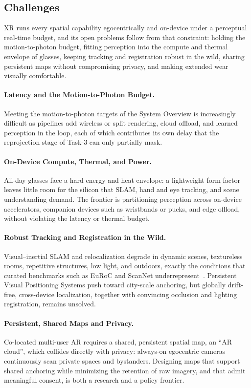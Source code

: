 \subsection{Challenges}
\label{subsec:p4-sec10-1-challenges}

XR runs every spatial capability egocentrically and on-device under a perceptual real-time budget, and its open problems follow from that constraint: holding the motion-to-photon budget, fitting perception into the compute and thermal envelope of glasses, keeping tracking and registration robust in the wild, sharing persistent maps without compromising privacy, and making extended wear visually comfortable.

\paragraph{Latency and the Motion-to-Photon Budget.} Meeting the motion-to-photon targets of the System Overview is increasingly difficult as pipelines add wireless or split rendering, cloud offload, and learned perception in the loop, each of which contributes its own delay that the reprojection stage of Task-3 can only partially mask.

\paragraph{On-Device Compute, Thermal, and Power.} All-day glasses face a hard energy and heat envelope: a lightweight form factor leaves little room for the silicon that SLAM, hand and eye tracking, and scene understanding demand. The frontier is partitioning perception across on-device accelerators, companion devices such as wristbands or pucks, and edge offload, without violating the latency or thermal budget.

\paragraph{Robust Tracking and Registration in the Wild.} Visual--inertial SLAM and relocalization degrade in dynamic scenes, textureless rooms, repetitive structures, low light, and outdoors, exactly the conditions that curated benchmarks such as EuRoC and ScanNet underrepresent~\cite{Burri2016EuRoC,dai2017scannet}. 
Persistent Visual Positioning Systems push toward city-scale anchoring, but globally drift-free, cross-device localization, together with convincing occlusion and lighting registration, remains unsolved.

\paragraph{Persistent, Shared Maps and Privacy.} Co-located multi-user AR requires a shared, persistent spatial map, an ``AR cloud'', which collides directly with privacy: always-on egocentric cameras continuously scan private spaces and bystanders. 
Designing maps that support shared anchoring while minimizing the retention of raw imagery, and that admit meaningful consent, is both a research and a policy frontier.

